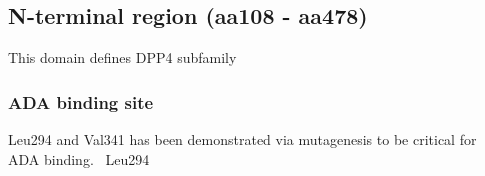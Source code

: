 \subsection{N-terminal region (aa108 - aa478)}

This domain defines DPP4 subfamily

\subsubsection{ADA binding site}
Leu294 and Val341 has been demonstrated via mutagenesis to be critical for ADA binding.~\cite{Abbott_1999} Leu294